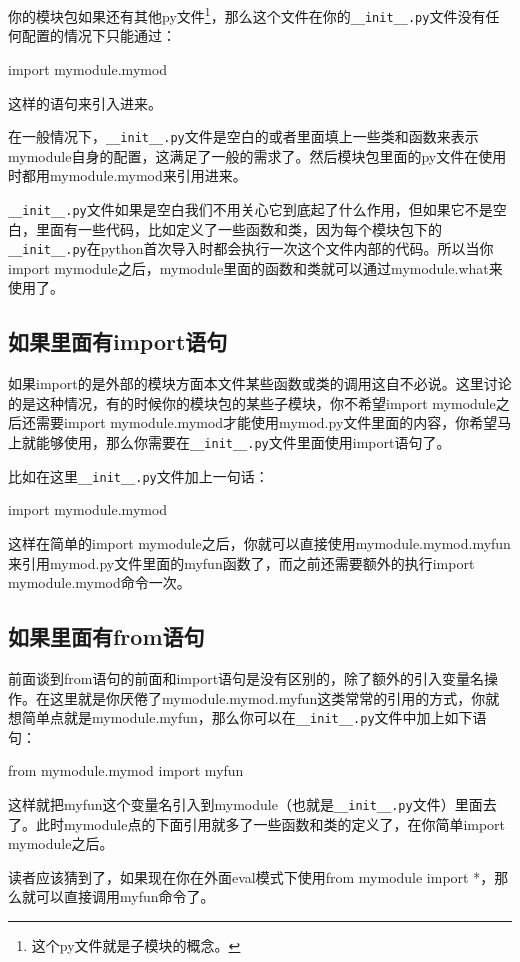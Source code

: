 \documentclass[12pt,oneside]{book}
\begin{document}
\begin{common-format}
你的模块包如果还有其他py文件\footnote{这个py文件就是子模块的概念。}，那么这个文件在你的\verb+__init__.py+文件没有任何配置的情况下只能通过：
\begin{tcbpython}[]
import mymodule.mymod
\end{tcbpython}
这样的语句来引入进来。

在一般情况下，\verb+__init__.py+文件是空白的或者里面填上一些类和函数来表示mymodule自身的配置，这满足了一般的需求了。然后模块包里面的py文件在使用时都用mymodule.mymod来引用进来。

\verb+__init__.py+文件如果是空白我们不用关心它到底起了什么作用，但如果它不是空白，里面有一些代码，比如定义了一些函数和类，因为每个模块包下的\verb+__init__.py+在python首次导入时都会执行一次这个文件内部的代码。所以当你import mymodule之后，mymodule里面的函数和类就可以通过mymodule.what来使用了。

\subsection{如果里面有import语句}
如果import的是外部的模块方面本文件某些函数或类的调用这自不必说。这里讨论的是这种情况，有的时候你的模块包的某些子模块，你不希望import mymodule之后还需要import mymodule.mymod才能使用mymod.py文件里面的内容，你希望马上就能够使用，那么你需要在\verb+__init__.py+文件里面使用import语句了。

比如在这里\verb+__init__.py+文件加上一句话：
\begin{tcbpython}
import mymodule.mymod
\end{tcbpython}

这样在简单的import mymodule之后，你就可以直接使用mymodule.mymod.myfun来引用mymod.py文件里面的myfun函数了，而之前还需要额外的执行import mymodule.mymod命令一次。


\subsection{如果里面有from语句}
前面谈到from语句的前面和import语句是没有区别的，除了额外的引入变量名操作。在这里就是你厌倦了mymodule.mymod.myfun这类常常的引用的方式，你就想简单点就是mymodule.myfun，那么你可以在\verb+__init__.py+文件中加上如下语句：
\begin{tcbpython}[]
from mymodule.mymod import myfun
\end{tcbpython}
这样就把myfun这个变量名引入到mymodule（也就是\verb+__init__.py+文件）里面去了。此时mymodule点的下面引用就多了一些函数和类的定义了，在你简单import mymodule之后。

读者应该猜到了，如果现在你在外面eval模式下使用from mymodule import *，那么就可以直接调用myfun命令了。



\end{common-format}
\end{document}
